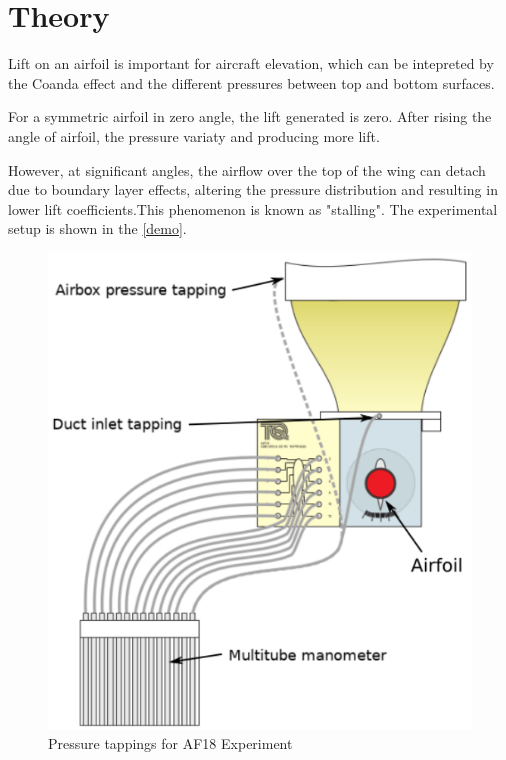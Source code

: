 \section{Theory}
\FloatBarrier %

Lift on an airfoil is important for aircraft elevation, which can be intepreted by the Coanda effect and the different pressures between top and bottom surfaces. 

For a symmetric airfoil in zero angle, the lift generated is zero. 
After rising the angle of airfoil, the pressure variaty and producing more lift. 

However, at significant angles, the airflow over the top of the wing can detach due to boundary layer effects, altering the pressure distribution and resulting in lower lift coefficients.This phenomenon is known as "stalling".
The experimental setup is shown in the \autoref{demo}.
\begin{figure}[] %
    \centering
    \includegraphics[scale=0.3]{fig/AF18.png}
    \caption{Pressure tappings for AF18 Experiment}
    \label{demo}
\end{figure}




